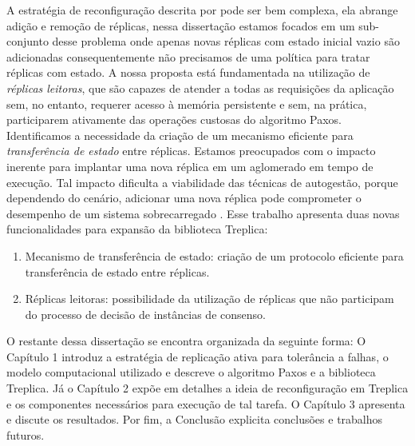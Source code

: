 A estratégia de reconfiguração descrita por \cite{lamport10} pode ser bem complexa, ela
abrange adição e remoção de réplicas, nessa dissertação estamos focados em um sub-conjunto
desse problema onde apenas novas réplicas com estado inicial vazio são adicionadas
consequentemente não precisamos de uma política para tratar réplicas com estado. A nossa
proposta está fundamentada na utilização de \emph{réplicas leitoras}, que são capazes de
atender a todas as requisições da aplicação sem, no entanto, requerer acesso à memória
persistente e sem, na prática, participarem ativamente das operações custosas do algoritmo
Paxos. Identificamos a necessidade da criação de um mecanismo eficiente para
\emph{transferência de estado} entre réplicas. Estamos preocupados com o impacto inerente
para implantar uma nova réplica em um aglomerado em tempo de execução. Tal impacto
dificulta a viabilidade das técnicas de autogestão, porque dependendo do cenário,
adicionar uma nova réplica pode comprometer o desempenho de um sistema sobrecarregado
\cite{vilaca09}. Esse trabalho apresenta duas novas funcionalidades para expansão da
biblioteca Treplica:

\begin{enumerate}
  \item Mecanismo de transferência de estado: criação de um protocolo eficiente para
    transferência de estado entre réplicas.
  \item Réplicas leitoras: possibilidade da utilização de réplicas que não participam do
    processo de decisão de instâncias de consenso.
\end{enumerate}

O restante dessa dissertação se encontra organizada da seguinte forma: O Capítulo 1
introduz a estratégia de replicação ativa para tolerância a falhas, o modelo computacional
utilizado e descreve o algoritmo Paxos e a biblioteca Treplica. Já o Capítulo 2 expõe em
detalhes a ideia de reconfiguração em Treplica e os componentes necessários para execução
de tal tarefa. O Capítulo 3 apresenta e discute os resultados. Por fim, a Conclusão
explicita conclusões e trabalhos futuros.

